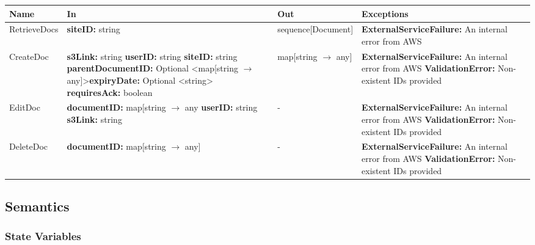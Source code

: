 \documentclass[12pt, titlepage]{article}
\begin{document}
{  \begin{center}
    \begin{tabular}{>{\raggedright}p{3cm} >{\raggedright}p{5cm}
      >{\raggedright}p{4cm} p{4cm}}
      \hline
      \textbf{Name} & \textbf{In} & \textbf{Out} & \textbf{Exceptions} \\
      \hline
      RetrieveDocs & \textbf{siteID:} string & sequence[Document] &
      \textbf{ExternalServiceFailure:} An internal error from AWS \\
      \hline
      CreateDoc & \textbf{s3Link:} string \newline \textbf{userID:}
      string \newline \textbf{siteID:} string \newline
      \textbf{parentDocumentID:} Optional \textless map[string
      $\rightarrow$ any]\textgreater \newline \textbf{expiryDate:}
      Optional \textless string\textgreater \newline
      \textbf{requiresAck:} boolean & map[string $\rightarrow$ any] &
      \textbf{ExternalServiceFailure:} An internal error from AWS \newline
      \textbf{ValidationError:} Non-existent IDs provided \\
      \hline
      EditDoc & \textbf{documentID:} map[string $\rightarrow$ any
        \newline \textbf{userID:} string \newline
        \textbf{s3Link:}
        string & - &
        \textbf{ExternalServiceFailure:} An internal error from AWS \newline
        \textbf{ValidationError:} Non-existent IDs provided \\
        \hline
        DeleteDoc & \textbf{documentID:} map[string $\rightarrow$ any] & - &
        \textbf{ExternalServiceFailure:} An internal error from AWS \newline
        \textbf{ValidationError:} Non-existent IDs provided \\
        \hline
      \end{tabular}
    \end{center}

    \subsection{Semantics}

    \subsubsection{State Variables}

}
\end{document}
